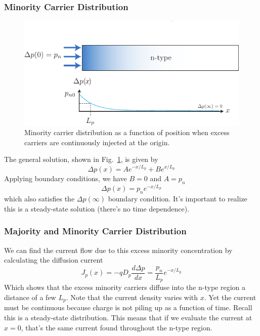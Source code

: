 \subsubsection*{Minority Carrier Distribution}

\begin{figure}[tb]
\begin{center}
\includegraphics[width=.75\columnwidth]{excess_charge_inject_sol}
\end{center}
\caption{Minority carrier distribution as a function of position when excess carriers are continuously injected at the origin. } \label{fig:excess_charge_inject_sol}
\end{figure}
%
The general solution, shown in Fig.~\ref{fig:excess_charge_inject_sol}, is given by
%
\begin{equation}
	\Delta p(x) = A e^{-x/L_p} + B e^{x/L_p}
\end{equation}	
 Applying boundary conditions, we have $B = 0$ and $A = p_{n}$
\begin{equation}
	\Delta p(x) = p_n e^{-x/L_p} 
\end{equation}	
which also satisfies the $\Delta p(\infty)$ boundary condition.   It's important to realize this is a steady-state solution (there's no time dependence).   
 

\subsubsection*{Majority and Minority Carrier Distribution}

We can find the current flow due to this excess minority concentration by calculating the diffusion current
\begin{equation}
	J_p(x) = -q D_p \frac{d \Delta p}{dx} = \frac{p_n}{L_p} e^{-x/L_p} 
\end{equation}	
Which shows that the excess minority carriers diffuse into the n-type region a distance of a few $L_p$.  Note that the current density varies with $x$.  Yet the current must be continuous because charge is not piling up as a function of time.  Recall this is a steady-state distribution.  This means that if we evaluate the current at $x = 0$, that's the same current found throughout the n-type region. 
 
